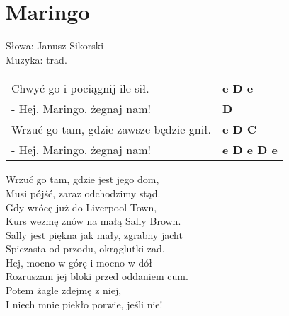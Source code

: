 \section{Maringo}

Słowa: Janusz Sikorski\\
Muzyka: trad.

\vspace{2em}
\begin{tabular}{@{}p{7cm}@{}l@{}}
Chwyć go i pociągnij ile sił. & \bfseries e D e\\
- Hej, Maringo, żegnaj nam! & \bfseries D\\
Wrzuć go tam, gdzie zawsze będzie gnił. & \bfseries e D C\\
- Hej, Maringo, żegnaj nam! & \bfseries e D e D e\\
\end{tabular}

\vspace{1em}
Wrzuć go tam, gdzie jest jego dom, \\
Musi pójść, zaraz odchodzimy stąd. \\

Gdy wrócę już do Liverpool Town, \\
Kurs wezmę znów na małą Sally Brown. \\

Sally jest piękna jak mały, zgrabny jacht \\
Spiczasta od przodu, okrąglutki zad. \\

Hej, mocno w górę i mocno w dół \\
Rozruszam jej bloki przed oddaniem cum. \\

Potem żagle zdejmę z niej, \\
I niech mnie piekło porwie, jeśli nie! \\